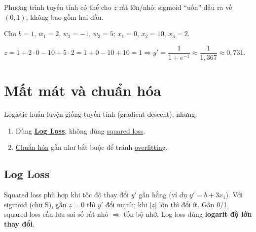 \documentclass[12pt,a4paper]{article}
\begin{document}
\begin{tinhchat}[title={Tuyến tính vs sigmoid}]
Phương trình tuyến tính có thể cho $z$ rất lớn/nhỏ; sigmoid ``uốn'' đầu ra về $(0,1)$, không bao gồm hai đầu.
\end{tinhchat}

\begin{luuy}[title={Ví dụ: Tính $z$ và $y'$}]
Cho $b=1$, $w_1=2$, $w_2=-1$, $w_3=5$; $x_1=0$, $x_2=10$, $x_3=2$.

$z = 1 + 2 \cdot 0 - 10 + 5 \cdot 2 = 1+0-10+10=1 \Rightarrow y' = \dfrac{1}{1+e^{-1}} \approx \dfrac{1}{1{,}367} \approx 0{,}731$.
\end{luuy}

\newpage

\section{Mất mát và chuẩn hóa}

\begin{dongco}[title={Cùng quy trình huấn luyện, khác loss và chuẩn hóa}]
Logistic huấn luyện giống tuyến tính (gradient descent), nhưng:
\begin{enumerate}
  \item Dùng \href{https://developers.google.com/machine-learning/glossary\#Log_Loss}{\textbf{Log Loss}}, không dùng \href{https://developers.google.com/machine-learning/glossary\#l2-loss}{squared loss}.
  \item \href{https://developers.google.com/machine-learning/glossary\#regularization}{Chuẩn hóa} gần như bắt buộc để tránh \href{https://developers.google.com/machine-learning/glossary\#overfitting}{overfitting}.
\end{enumerate}
\end{dongco}

\subsection{Log Loss}

\begin{ynghia}[title={Vì sao không dùng squared loss?}]
Squared loss phù hợp khi tốc độ thay đổi $y'$ gần hằng (ví dụ $y'=b+3x_1$). Với sigmoid (chữ S), gần $z=0$ thì $y'$ đổi mạnh; khi $|z|$ lớn thì đổi ít. Gần 0/1, squared loss cần lưu sai số rất nhỏ $\Rightarrow$ tốn bộ nhớ. Log loss dùng \textbf{logarit độ lớn thay đổi}.
\end{ynghia}
\end{document}
